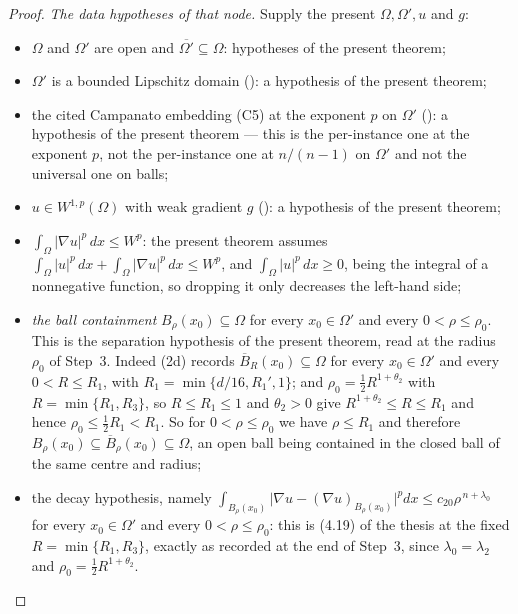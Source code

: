 \begin{proof}
\emph{The data hypotheses of that node.}  Supply the present $\Omega,\Omega',u$
and $g$:
\begin{itemize}
\item $\Omega$ and $\Omega'$ are open and $\overline{\Omega'}\subseteq\Omega$:
  hypotheses of the present theorem;
\item $\Omega'$ is a bounded Lipschitz domain
  (): a hypothesis of the present theorem;
\item the cited Campanato embedding (C5) at the exponent $p$ on $\Omega'$
  (): a hypothesis of the present theorem ---
  this is the per-instance one at the exponent $p$, not the per-instance one at
  $n/(n-1)$ on $\Omega'$ and not the universal one on balls;
\item $u\in W^{1,p}(\Omega)$ with weak gradient $g$ (): a
  hypothesis of the present theorem;
\item $\int_\Omega|\nabla u|^p\,dx\le W^p$: the present theorem assumes
  $\int_\Omega|u|^p\,dx+\int_\Omega|\nabla u|^p\,dx\le W^p$, and
  $\int_\Omega|u|^p\,dx\ge0$, being the integral of a nonnegative function, so
  dropping it only decreases the left-hand side;
\item \emph{the ball containment} $B_\rho(x_0)\subseteq\Omega$ for every
  $x_0\in\Omega'$ and every $0<\rho\le\rho_0$.  This is the separation
  hypothesis of the present theorem, read at the radius $\rho_0$ of Step~3.
  Indeed (2d) records $\overline B_R(x_0)\subseteq\Omega$ for every
  $x_0\in\Omega'$ and every $0<R\le R_1$, with $R_1=\min\{d/16,R_1',1\}$; and
  $\rho_0=\tfrac12R^{1+\theta_2}$ with $R=\min\{R_1,R_3\}$, so $R\le R_1\le1$
  and $\theta_2>0$ give $R^{1+\theta_2}\le R\le R_1$ and hence
  $\rho_0\le\tfrac12R_1<R_1$.  So for $0<\rho\le\rho_0$ we have $\rho\le R_1$
  and therefore $B_\rho(x_0)\subseteq\overline B_\rho(x_0)\subseteq\Omega$, an
  open ball being contained in the closed ball of the same centre and radius;
\item the decay hypothesis, namely
  $\int_{B_\rho(x_0)}\bigl|\nabla u-(\nabla u)_{B_\rho(x_0)}\bigr|^pdx\le
  c_{20}\rho^{\,n+\lambda_0}$ for every $x_0\in\Omega'$ and every
  $0<\rho\le\rho_0$: this is (4.19) of the thesis at the fixed
  $R=\min\{R_1,R_3\}$, exactly as recorded at the end of Step~3, since
  $\lambda_0=\lambda_2$ and $\rho_0=\tfrac12R^{1+\theta_2}$.
\end{itemize}


\end{proof}
